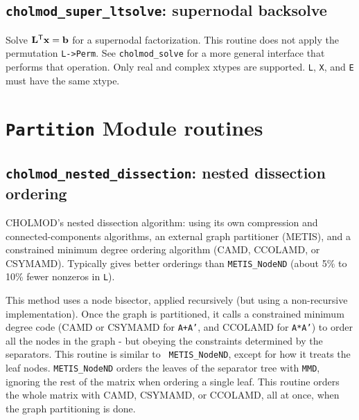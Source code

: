 \documentclass[11pt]{article}
\newcommand{\m}[1]{{\bf{#1}}}       %
\newcommand{\tr}{^{\sf T}}          %
\begin{document}
\subsection{{\tt cholmod\_super\_ltsolve}: supernodal backsolve}


Solve $\m{L}\tr\m{x}=\m{b}$ for a supernodal factorization.  This routine does
not apply the permutation {\tt L->Perm}.  See {\tt cholmod\_solve} for a more
general interface that performs that operation.  Only real and complex xtypes
are supported.  {\tt L}, {\tt X}, and {\tt E} must have the same xtype.

\newpage \section{{\tt Partition} Module routines}

\subsection{{\tt cholmod\_nested\_dissection}: nested dissection ordering}


CHOLMOD's nested dissection algorithm: using its own compression and
connected-components algorithms, an external graph partitioner (METIS), and a
constrained minimum degree ordering algorithm (CAMD, CCOLAMD, or CSYMAMD).
Typically gives better orderings than {\tt METIS\_NodeND} (about 5\% to 10\%
fewer nonzeros in {\tt L}).

This method uses a node bisector, applied recursively (but using a
non-recursive implementation).  Once the graph is partitioned, it calls a
constrained minimum degree code (CAMD or CSYMAMD for {\tt A+A'}, and CCOLAMD
for {\tt A*A'}) to order all the nodes in the graph - but obeying the
constraints determined by the separators.  This routine is similar to {\tt
METIS\_NodeND}, except for how it treats the leaf nodes.  {\tt METIS\_NodeND}
orders the leaves of the separator tree with {\tt MMD}, ignoring the rest of
the matrix when ordering a single leaf.  This routine orders the whole matrix
with CAMD, CSYMAMD, or CCOLAMD, all at once, when the graph partitioning is
done.
\end{document}
